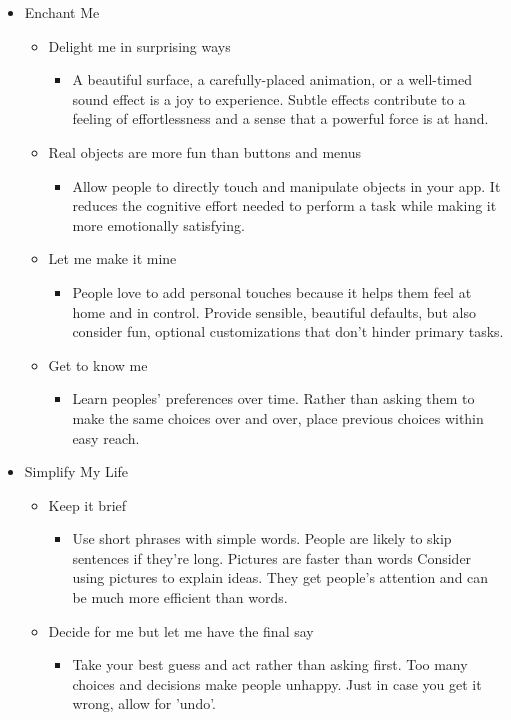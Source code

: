 \begin{itemize}
\item Enchant Me
\begin{itemize}
\item Delight me in surprising ways
\begin{itemize}
\item A beautiful surface, a carefully-placed animation, or a well-timed sound effect is a joy to experience. Subtle effects contribute to a feeling of effortlessness and a sense that a powerful force is at hand.
\end{itemize}
\item Real objects are more fun than buttons and menus
\begin{itemize}
\item Allow people to directly touch and manipulate objects in your app. It reduces the cognitive effort needed to perform a task while making it more emotionally satisfying.
\end{itemize}
\item Let me make it mine
\begin{itemize}
\item People love to add personal touches because it helps them feel at home and in control. Provide sensible, beautiful defaults, but also consider fun, optional customizations that don't hinder primary tasks.
\end{itemize}
\item Get to know me
\begin{itemize}
\item Learn peoples' preferences over time. Rather than asking them to make the same choices over and over, place previous choices within easy reach.
\end{itemize}
\end{itemize}
\newpage
\item Simplify My Life
\begin{itemize}
\item Keep it brief
\begin{itemize}
\item Use short phrases with simple words. People are likely to skip sentences if they're long.
Pictures are faster than words
Consider using pictures to explain ideas. They get people's attention and can be much more efficient than words.
\end{itemize}
\item Decide for me but let me have the final say
\begin{itemize}
\item Take your best guess and act rather than asking first. Too many choices and decisions make people unhappy. Just in case you get it wrong, allow for 'undo'.

\end{itemize}
\end{itemize}
\end{itemize}
